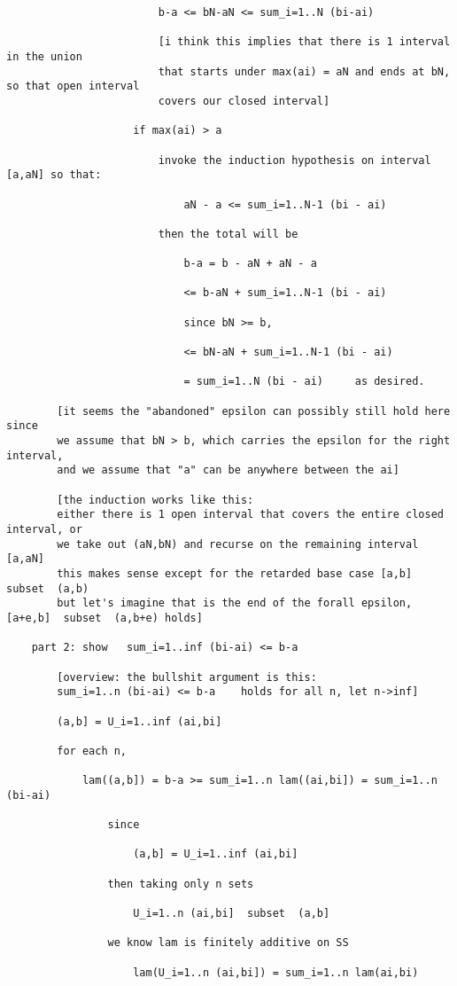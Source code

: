 \documentclass{article}
\begin{document}
\begin{flushleft}
\begin{verbatim}
						b-a <= bN-aN <= sum_i=1..N (bi-ai)
						
						[i think this implies that there is 1 interval in the union
						that starts under max(ai) = aN and ends at bN, so that open interval
						covers our closed interval]
						
					if max(ai) > a
					
						invoke the induction hypothesis on interval [a,aN] so that:
						
							aN - a <= sum_i=1..N-1 (bi - ai)
			
						then the total will be
						
							b-a = b - aN + aN - a
							
							<= b-aN + sum_i=1..N-1 (bi - ai)
							
							since bN >= b,
							
							<= bN-aN + sum_i=1..N-1 (bi - ai)
	
							= sum_i=1..N (bi - ai)     as desired.
					
		[it seems the "abandoned" epsilon can possibly still hold here since
		we assume that bN > b, which carries the epsilon for the right interval,
		and we assume that "a" can be anywhere between the ai]
		
		[the induction works like this: 
		either there is 1 open interval that covers the entire closed interval, or
		we take out (aN,bN) and recurse on the remaining interval [a,aN]
		this makes sense except for the retarded base case [a,b]  subset  (a,b)
		but let's imagine that is the end of the forall epsilon, [a+e,b]  subset  (a,b+e) holds]
		
	part 2: show   sum_i=1..inf (bi-ai) <= b-a
	
		[overview: the bullshit argument is this:
		sum_i=1..n (bi-ai) <= b-a    holds for all n, let n->inf]
		
		(a,b] = U_i=1..inf (ai,bi]
		
		for each n, 
		
			lam((a,b]) = b-a >= sum_i=1..n lam((ai,bi]) = sum_i=1..n (bi-ai)
	
				since
				
					(a,b] = U_i=1..inf (ai,bi]
					
				then taking only n sets
				
					U_i=1..n (ai,bi]  subset  (a,b]
					
				we know lam is finitely additive on SS
				
					lam(U_i=1..n (ai,bi]) = sum_i=1..n lam(ai,bi) 
				

\end{verbatim}
\end{flushleft}
\end{document}
